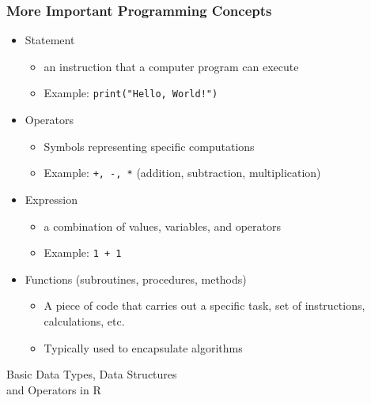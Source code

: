 \documentclass{beamer}
\begin{document}
\begin{frame}[fragile]
  \frametitle{More Important Programming Concepts}
\begin{itemize}

\item Statement
\begin{itemize}
	\item an instruction that a computer program can execute
	\item Example: \verb=print("Hello, World!")=
\end{itemize}

\item Operators
\begin{itemize}
	\item Symbols representing specific computations
	\item Example: \verb!+, -, *! (addition, subtraction, multiplication)
\end{itemize}


\item Expression
\begin{itemize}
	\item a combination of values, variables, and operators
	\item Example: \texttt{1 + 1}
\end{itemize}


\item Functions (subroutines, procedures, methods)
\begin{itemize}
	\item A piece of code that carries out a specific task, set of instructions, calculations, etc.
	\item Typically used to encapsulate algorithms
\end{itemize}

\end{itemize}

\end{frame}

\begin{frame}

\begin{center}
\LARGE{Basic Data Types, Data Structures \\ and Operators in R}

\end{center}
\end{frame}
\end{document}
